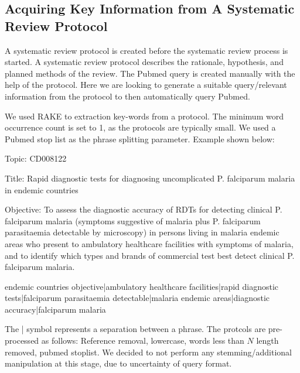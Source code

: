 \subsection{Acquiring Key Information from A Systematic Review Protocol}

A systematic review protocol is created before the systematic review process is started. A systematic review protocol describes the rationale, hypothesis, and planned methods of the review. The Pubmed query is created manually with the help of the protocol. Here we are looking to generate a suitable query/relevant information from the protocol to then automatically query Pubmed.

We used RAKE \cite{rake} to extraction key-words from a protocol. The minimum word occurrence count is set to 1, as the protocols are typically small. We used a Pubmed stop list as the phrase splitting parameter. Example shown below:

\begin{tcolorbox}

Topic: CD008122 

Title: Rapid diagnostic tests for diagnosing uncomplicated P. falciparum malaria in endemic countries 

Objective: To assess the diagnostic accuracy of RDTs for detecting clinical P. falciparum malaria (symptoms suggestive of malaria plus P. falciparum parasitaemia detectable by microscopy) in persons living in malaria endemic areas who present to ambulatory healthcare facilities with symptoms of malaria, and to identify which types and brands of commercial test best detect clinical P. falciparum malaria.

\end{tcolorbox}

 
 
\begin{tcolorbox}

endemic countries objective|ambulatory healthcare facilities|rapid diagnostic tests|falciparum parasitaemia detectable|malaria endemic areas|diagnostic accuracy|falciparum malaria

\end{tcolorbox}

The | symbol represents a separation between a phrase. The protcols are pre-processed as follows: Reference removal, lowercase, words less than $N$ length removed, pubmed stoplist. We decided to not perform any stemming/additional manipulation at this stage, due to uncertainty of query format.

